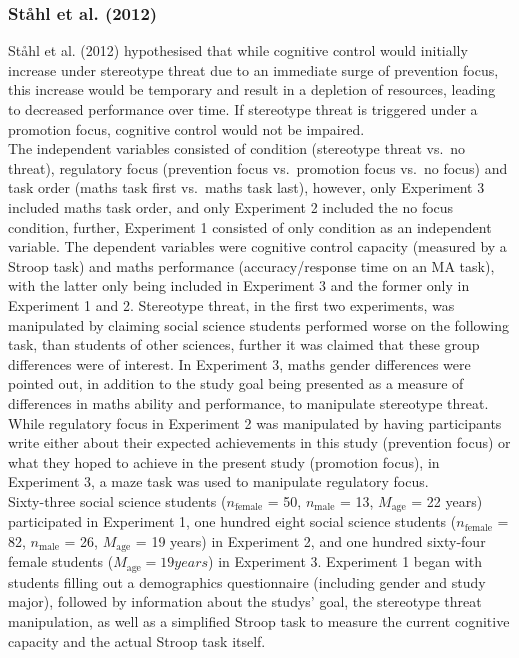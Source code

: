 \documentclass[
  stu,floatsintext]{apa7}
\begin{document}
\subsubsection{Ståhl et al. (2012)}\label{stahlrolepreventionfocus2012}

Ståhl et al. (2012) hypothesised that while cognitive control would initially increase under stereotype threat due to an immediate surge of prevention focus, this increase would be temporary and result in a depletion of resources, leading to decreased performance over time.
If stereotype threat is triggered under a promotion focus, cognitive control would not be impaired.\\
The independent variables consisted of condition (stereotype threat vs.~no threat), regulatory focus (prevention focus vs.~promotion focus vs.~no focus) and task order (maths task first vs.~maths task last), however, only Experiment 3 included maths task order, and only Experiment 2 included the no focus condition, further, Experiment 1 consisted of only condition as an independent variable.
The dependent variables were cognitive control capacity (measured by a Stroop task) and maths performance (accuracy/response time on an MA task), with the latter only being included in Experiment 3 and the former only in Experiment 1 and 2.
Stereotype threat, in the first two experiments, was manipulated by claiming social science students performed worse on the following task, than students of other sciences, further it was claimed that these group differences were of interest.
In Experiment 3, maths gender differences were pointed out, in addition to the study goal being presented as a measure of differences in maths ability and performance, to manipulate stereotype threat.
While regulatory focus in Experiment 2 was manipulated by having participants write either about their expected achievements in this study (prevention focus) or what they hoped to achieve in the present study (promotion focus), in Experiment 3, a maze task was used to manipulate regulatory focus.\\
Sixty-three social science students (\(n_{\text{female}}\) = 50, \(n_{\text{male}}\) = 13, \(M_{\text{age}}\) = 22 years) participated in Experiment 1, one hundred eight social science students (\(n_{\text{female}}\) = 82, \(n_{\text{male}}\) = 26, \(M_{\text{age}}\) = 19 years) in Experiment 2, and one hundred sixty-four female students (\(M_{\text{age}} = 19 years\)) in Experiment 3.
Experiment 1 began with students filling out a demographics questionnaire (including gender and study major), followed by information about the studys' goal, the stereotype threat manipulation, as well as a simplified Stroop task to measure the current cognitive capacity and the actual Stroop task itself.
\end{document}
